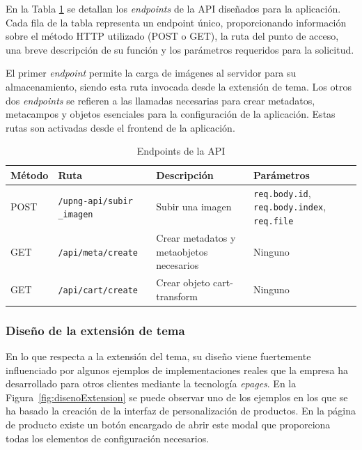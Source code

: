 \documentclass[11pt]{article}
\begin{document}
En la Tabla \ref{tab:endpoints} se detallan los \textit{endpoints} de la API diseñados para la aplicación. 
Cada fila de la tabla representa un endpoint único, proporcionando información sobre el método HTTP 
utilizado (POST o GET), la ruta del punto de acceso, una breve descripción de su función y los parámetros 
requeridos para la solicitud.

El primer \textit{endpoint} permite la carga de imágenes al servidor para su almacenamiento, siendo esta ruta invocada 
desde la extensión de tema. Los otros dos \textit{endpoints} se refieren a las llamadas necesarias para crear metadatos, 
metacampos y objetos esenciales para la configuración de la aplicación. Estas rutas son activadas desde el frontend de la aplicación.

\begin{table}[h!]
    \centering
    \begin{tabularx}{\textwidth}{|X|X|X|X|}
        \hline
        \textbf{Método} & \textbf{Ruta} & \textbf{Descripción} & \textbf{Parámetros} \\
        \hline
        POST & \texttt{/upng-api/subir
        \_imagen} & Subir una imagen & 
        \texttt{req.body.id}, \texttt{req.body.index}, \texttt{req.file} \\
        \hline
        GET & \texttt{/api/meta/create} & Crear metadatos y metaobjetos necesarios & Ninguno \\
        \hline
        GET & \texttt{/api/cart/create} & Crear objeto 
        cart-transform & Ninguno \\
        \hline
    \end{tabularx}
    \caption{Endpoints de la API}
    \label{tab:endpoints}
\end{table}

\subsubsection{Diseño de la extensión de tema}
En lo que respecta a la extensión del tema, su diseño viene fuertemente influenciado por algunos ejemplos de implementaciones reales que la empresa ha desarrollado para otros clientes 
mediante la tecnología \textit{epages}. En la Figura~\ref{fig:disenoExtension} se puede observar uno de los ejemplos en los que se ha basado la creación de la interfaz
de personalización de productos. En la página de producto existe un botón encargado de abrir este modal que proporciona todas los elementos de configuración necesarios.
\end{document}
